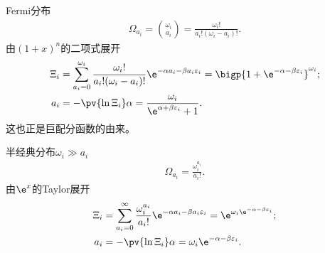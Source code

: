Fermi分布
\begin{align}
	\Omega_{a_i}=\binom{\omega_i}{a_i}=\frac{\omega_i!}{a_i!(\omega_i-a_i)!}.
\end{align}
由$(1+x)^n$的二项式展开
\begin{align}
	\Xi_i&=\sum_{a_i=0}^{\omega_i}\frac{\omega_i!}{a_i!(\omega_i-a_i)!}\e^{-\alpha a_i-\beta a_i\varepsilon_i}=\bigp{1+\e^{-\alpha-\beta\varepsilon_i}}^{\omega_i};\\
	a_i&=-\pv{\ln\Xi_i}\alpha=\frac{\omega_i}{\e^{\alpha+\beta\varepsilon_i}+1}.
\end{align}
这也正是巨配分函数的由来。

半经典分布$\omega_i\gg a_i$ 
\begin{align}
	\Omega_{a_i}=\frac{\omega_i^{a_i}}{a_i!}.
\end{align}
由$\e^{x}$的Taylor展开
\begin{align}
	\Xi_i&=\sum_{a_i=0}^\infty\frac{\omega_i^{a_i}}{a_i!}\e^{-\alpha a_i-\beta a_i\varepsilon_i}=\e^{\omega_i\e^{-\alpha-\beta\varepsilon_i}};\\
	a_i&=-\pv{\ln\Xi_i}\alpha=\omega_i\e^{-\alpha-\beta\varepsilon_i}.
\end{align}